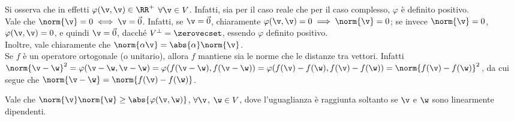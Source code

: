 \begin{remark}\nl
	\li Si osserva che in effetti $\varphi(\v, \v) \in \RR^+$ $\forall \v \in V$. Infatti, sia
	per il caso reale che per il caso complesso, $\varphi$ è definito positivo. \\
	\li Vale che $\norm{\v} = 0 \iff \v = \vec 0$. Infatti, se $\v = \vec 0$, chiaramente
	$\varphi(\v, \v) = 0 \implies \norm{\v} = 0$; se invece $\norm{\v} = 0$,
	$\varphi(\v, \v) = 0$, e quindi $\v = \vec 0$, dacché $V^\perp = \zerovecset$, essendo
	$\varphi$ definito positivo. \\
	\li Inoltre, vale chiaramente che $\norm{\alpha \v} = \abs{\alpha} \norm{\v}$. \\
	\li Se $f$ è un operatore ortogonale (o unitario), allora $f$ mantiene sia le
	norme che le distanze tra vettori. Infatti $\norm{\v - \w}^2 = \varphi(\v - \w, \v - \w) =
	\varphi(f(\v - \w), f(\v - \w)) = \varphi(f(\v) - f(\w), f(\v) - f(\w)) = \norm{f(\v) - f(\w)}^2$,
	da cui segue che $\norm{\v - \w} = \norm{f(\v) - f(\w)}$.
\end{remark}

\begin{proposition} 
	Vale che $\norm{\v} \norm{\w} \geq \abs{\varphi(\v, \w)}$, $\forall \v$, $\w \in V$, dove
	l'uguaglianza è raggiunta soltanto se $\v$ e $\w$ sono linearmente dipendenti.
\end{proposition}

